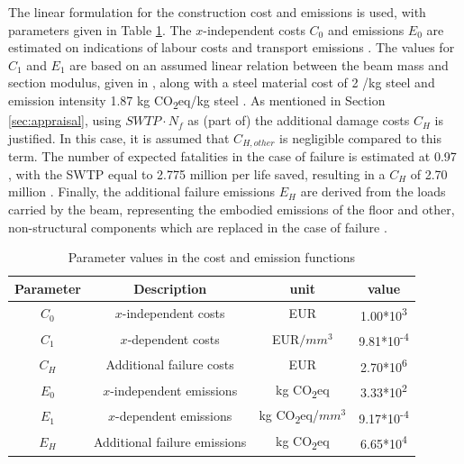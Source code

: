 The linear formulation for the construction cost and emissions is used, with parameters given in Table \ref{tab:C_E_params}.
The $x$-independent costs $C_0$ and emissions $E_0$ are estimated on indications of labour costs and transport emissions \citep{Knibbe2026PlaceHolder, Musa2024COPeriod, Fortus2025StalenVergunning}.
The values for $C_1$ and $E_1$ are based on an assumed linear relation between the beam mass and section modulus, given in \citep{Hingorani2023SustainabilityDesign}, along with a steel material cost of 2 \EUR{}/kg steel \citep{Hingorani2023SustainabilityDesign, bauforumstahle.V.2026BaukostenBauforumstahl} and emission intensity 1.87 kg CO\textsubscript{2}eq/kg  steel \citep{TATASteel2017BenefitsOwnership}.
As mentioned in Section \ref{sec:appraisal}, using $SWTP \cdot N_f$ as (part of) the additional damage costs $C_H$ is justified. 
In this case, it is assumed that $C_{H,other}$ is negligible compared to this term. 
The number of expected fatalities in the case of failure is estimated at 0.97 \citep{Knibbe2026PlaceHolder, Hingorani2020ConsequenceStructures}, with the SWTP equal to 2.775 million \EUR{} per life saved, resulting in a $C_H$ of 2.70 million \EUR{}.
Finally, the additional failure emissions $E_H$ are derived from the loads carried by the beam, representing the embodied emissions of the floor and other, non-structural components which are replaced in the case of failure \citep{Knibbe2026PlaceHolder, Hingorani2023SustainabilityDesign}.

\begin{table}[]
    \centering
    \begin{tabular}{c|c|c|c}
         Parameter & Description& unit  &value 
\\ \hline
 $C_0$& $x$-independent costs& EUR  &1.00*10\textsuperscript{3} 
\\
 $C_1$& $x$-dependent costs&EUR$/mm^3$ &9.81*10\textsuperscript{-4}
\\
 $C_H$& Additional failure costs&EUR &2.70*10\textsuperscript{6}
\\
 $E_0$& $x$-independent emissions&kg CO\textsubscript{2}eq &3.33*10\textsuperscript{2}
\\
 $E_1$& $x$-dependent emissions&kg CO\textsubscript{2}eq/$mm^3$ &9.17*10\textsuperscript{-4}
\\
 $E_H$& Additional failure emissions&kg CO\textsubscript{2}eq &6.65*10\textsuperscript{4}\\\end{tabular}
    \caption{Parameter values in the cost and emission functions}
    \label{tab:C_E_params}
\end{table}

